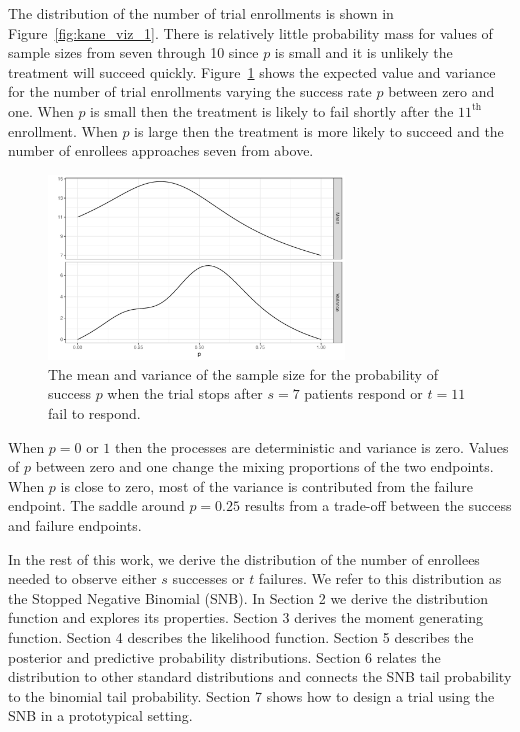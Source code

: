 \documentclass[sii]{ipart}
\begin{document}
The distribution of the number of trial enrollments is shown in 
Figure~\ref{fig:kane_viz_1}. There is relatively little probability mass
for values of sample sizes from seven through 10 since $p$ is small and it 
is unlikely the treatment will succeed quickly.
Figure~\ref{fig:kane_viz_2} shows the expected value and variance for the
number of trial enrollments varying the success rate $p$ between zero and one. When $p$ is small then the treatment
is likely to fail shortly after the $11^{\text{th}}$ enrollment.
When $p$ is large then the treatment is more likely to succeed and the 
number of enrollees approaches seven from above. 

\begin{figure}
\centering
\includegraphics[width=0.7\textwidth]{mean-and-variance.pdf}
\caption{
The mean and variance of the sample size for the probability of success $p$ 
when the trial stops after $s=7$ patients respond or $t=11$ fail to respond.
}
\label{fig:kane_viz_2}
\end{figure}

When $p=0$ or $1$ then the processes are deterministic and variance is zero.
Values of $p$ between zero and one change the mixing proportions of 
the two endpoints. When $p$ is close to zero, most of the variance
is contributed from the failure endpoint. The saddle around $p=0.25$ results 
from a trade-off between the success and failure endpoints.

In the rest of this work, we derive the distribution of the number of 
enrollees needed
to observe either $s$ successes or $t$ failures. We refer to this distribution
as the Stopped Negative Binomial (SNB). 
In Section 2 we derive the distribution function and explores its properties.
Section 3 derives the moment generating function.
Section 4 describes the likelihood function.
Section 5 describes the posterior and predictive probability distributions. Section 6 relates the distribution to other standard
distributions and connects the SNB tail probability to the binomial tail 
probability. Section 7 shows how to design a trial using the SNB in a prototypical setting.
\end{document}
